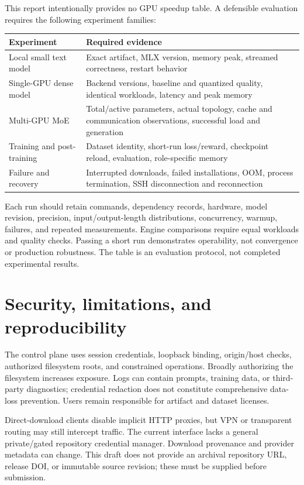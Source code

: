 \documentclass[10pt]{article}
\begin{document}
This report intentionally provides no GPU speedup table. A defensible evaluation requires the following experiment families:

\begin{center}
\begin{tabularx}{\linewidth}{@{}lX@{}}
\toprule
Experiment & Required evidence \\
\midrule
Local small text model & Exact artifact, MLX version, memory peak, streamed correctness, restart behavior \\
Single-GPU dense model & Backend versions, baseline and quantized quality, identical workloads, latency and peak memory \\
Multi-GPU MoE & Total/active parameters, actual topology, cache and communication observations, successful load and generation \\
Training and post-training & Dataset identity, short-run loss/reward, checkpoint reload, evaluation, role-specific memory \\
Failure and recovery & Interrupted downloads, failed installations, OOM, process termination, SSH disconnection and reconnection \\
\bottomrule
\end{tabularx}
\end{center}

Each run should retain commands, dependency records, hardware, model revision, precision, input/output-length distributions, concurrency, warmup, failures, and repeated measurements. Engine comparisons require equal workloads and quality checks. Passing a short run demonstrates operability, not convergence or production robustness. The table is an evaluation protocol, not completed experimental results.

\section{Security, limitations, and reproducibility}
The control plane uses session credentials, loopback binding, origin/host checks, authorized filesystem roots, and constrained operations. Broadly authorizing the filesystem increases exposure. Logs can contain prompts, training data, or third-party diagnostics; credential redaction does not constitute comprehensive data-loss prevention. Users remain responsible for artifact and dataset licenses.

Direct-download clients disable implicit HTTP proxies, but VPN or transparent routing may still intercept traffic. The current interface lacks a general private/gated repository credential manager. Download provenance and provider metadata can change. This draft does not provide an archival repository URL, release DOI, or immutable source revision; these must be supplied before submission.
\end{document}
